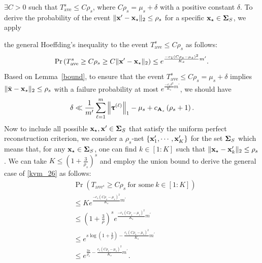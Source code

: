 \documentclass[12pt,draftcls,onecolumn]{IEEEtran}
\begin{document}
$\exists C>0$ such that $T_{\mathrm{ave}}^{s}\leq C\rho_s$, where $C\rho_s=\mu_s+\delta$ with a positive constant $\delta$. To derive the probability of the event $\|\mathbf{x}^{\prime}-\mathbf{x}_{\star}\|_2\leq\rho_s$ for a specific $\mathbf{x}_{\star}\in\boldsymbol{\Sigma}_{S}$, we apply

the general Hoeffding's inequality \cite[Theorem~2.6.2]{vershynin2018high} to the event $T_{\mathrm{ave}}^{s}\leq C\rho_s$ as follows:
\begin{equation}
\label{kvm_26}
\operatorname{Pr}\left(T_{\mathrm{ave}}^{s}\geq C\rho_s\geq C\|\mbx^{\prime}-\mbx_{\star}\|_2\right)\leq e^{\frac{-c_1\left(C\rho_s-\mu_s\right)^{2}}{K_s}m^{\prime}}.
\end{equation}
Based on Lemma~\ref{bound}, to ensure that the event $T_{\mathrm{ave}}^s\leq C\rho_s=\mu_s+\delta$ implies $\|\bar{\mathbf{x}}-\mathbf{x}_{\star}\|_2\leq\rho_s$ with a failure probability at most $e^{\frac{-c_1\delta^2}{K_s}m^{\prime}}$, we should have
\begin{equation}
\label{e7}
\delta\ll\frac{1}{m^{\prime}}\sum_{\ell=1}^{m}\left\|\boldsymbol{\uptau}^{(\ell)}\right\|_1-\mu_s
+c_{\mbA_s}\left(\rho_s+1\right).
\end{equation}
Now to include all possible $\mathbf{x}_{\star},\mathbf{x}^{\prime}\in\boldsymbol{\Sigma}_S$ that satisfy the uniform perfect reconstruction criterion, we consider a $\rho_s$-net $\left\{\mathbf{x}^{\prime}_1,\cdots,\mathbf{x}^{\prime}_K\right\}$ for the set $\boldsymbol{\Sigma}_S$ which means that, for any $\mathbf{x}_{\star}\in\boldsymbol{\Sigma}_S$, one can find $k\in[1:K]$ such that $\|\mathbf{x}_{\star}-\mathbf{x}^{\prime}_k\|_2\leq\rho_s$. We can take $K\leq\left(1+\frac{3}{\rho_s}\right)^s$ and employ the union bound to derive the general case of \eqref{kvm_26} as follows:
\begin{equation}
\label{kvm_100}
\begin{aligned}
&\operatorname{Pr}\left(T_{\mathrm{ave}^s}\geq C\rho_s~\text{for some}~k\in[1:K]\right)\\&\leq Ke^{\frac{-c_1\left(C\rho_s-\mu_s\right)^{2}}{K_s}m^{\prime}}\\&\leq\left(1+\frac{3}{\rho}\right)^{s}e^{\frac{-c_1\left(C\rho_s-\mu_s\right)^{2}}{K_s}m^{\prime}}\\&\leq e^{s\log\left(1+\frac{3}{\rho}\right)-\frac{c_1\left(C\rho_s-\mu_s\right)^{2}}{K_s}m^{\prime}}\\&\leq e^{\frac{3s}{\rho_s}-\frac{c_1\left(C\rho_s-\mu_s\right)^{2}}{K_s}m^{\prime}}.
\end{aligned}
\end{equation}
\end{document}
